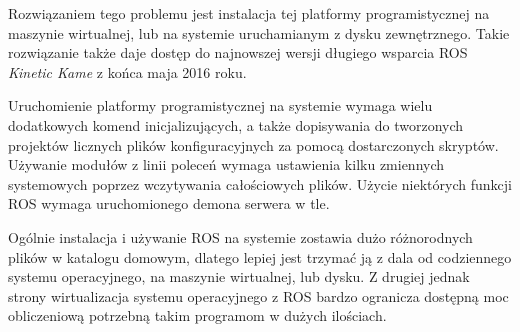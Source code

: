 	Rozwiązaniem tego problemu jest instalacja tej platformy programistycznej na maszynie wirtualnej, lub na systemie uruchamianym z dysku zewnętrznego. 
	Takie rozwiązanie także daje dostęp do najnowszej wersji długiego wsparcia ROS \emph{Kinetic Kame} z końca maja 2016 roku.

	Uruchomienie platformy programistycznej na systemie wymaga wielu dodatkowych komend inicjalizujących, a także dopisywania do tworzonych projektów licznych plików konfiguracyjnych za pomocą dostarczonych skryptów.
	Używanie modułów z linii poleceń wymaga ustawienia kilku zmiennych systemowych poprzez wczytywania całościowych plików.
	Użycie niektórych funkcji ROS wymaga uruchomionego demona serwera w tle.

	Ogólnie instalacja i używanie ROS na systemie zostawia dużo różnorodnych plików w katalogu domowym, dlatego lepiej jest trzymać ją z dala od codziennego systemu operacyjnego, na maszynie wirtualnej, lub dysku.
	Z drugiej jednak strony wirtualizacja systemu operacyjnego z ROS bardzo ogranicza dostępną moc obliczeniową potrzebną takim programom w dużych ilościach.

